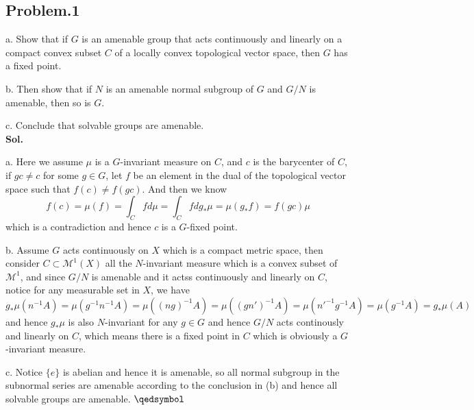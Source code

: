 \documentclass[lang=en,11pt,a4paper,citestyle =authoryear]{elegantpaper}
\newcommand{\prvd}{$\hfill \qedsymbol$}
\newcommand{\M}{\mathcal{M}}
\begin{document}
\subsection*{Problem.1}
a. Show that if $G$ is an amenable group that acts continuously
and linearly on a compact convex subset $C$ of a locally convex
topological vector space, then $G$ has a fixed point.\par
b. Then show that if $N$ is an amenable normal subgroup of $G$ and $G/N$ is amenable, then so is $G$.\par
c. Conclude that solvable groups are amenable.
\vspace{0.5em}\\
\textbf{Sol.} \par
a. Here we assume $\mu$ is a $G$-invariant measure on $C$, and $c$ is the barycenter of $C$, if $gc \neq c$ for some $g\in G$, let $f$ be an element in the dual of the topological vector space such that $f(c) \neq f(gc)$. And then we know 
\[f(c) = \mu(f) = \int_C fd\mu = \int_C fdg_*\mu  = \mu(g_*f) = f(gc)\mu\]
which is a contradiction and hence $c$ is a $G$-fixed point.\par
b. Assume $G$ acts continuously on $X$ which is a compact metric space, then consider $C \subset \M^1(X)$ all the $N$-invariant measure which is a convex subset of $\M^1$, and since $G/N$ is amenable and it actss continuously and linearly on $C$, notice for any measurable set in $X$, we have
\[
g_*\mu(n^{-1}A) = \mu(g^{-1}n^{-1}A) = \mu((ng)^{-1}A) = \mu((gn')^{-1}A) = \mu(n'^{-1}g^{-1}A) = \mu(g^{-1}A) = g_*\mu(A)
\]
and hence $g_*\mu$ is also $N$-invariant for any $g\in G$ and hence $G/N$ acts continously and linearly on $C$, which means there is a fixed point in $C$ which is obviously a $G$-invariant measure.\par
c. Notice $\{e\}$ is abelian and hence it is amenable, so all normal subgroup in the subnormal series are amenable according to the conclusion in (b) and hence all solvable groups are amenable. 
\prvd
\vspace{0.5em}


\addappheadtotoc
\end{document}
